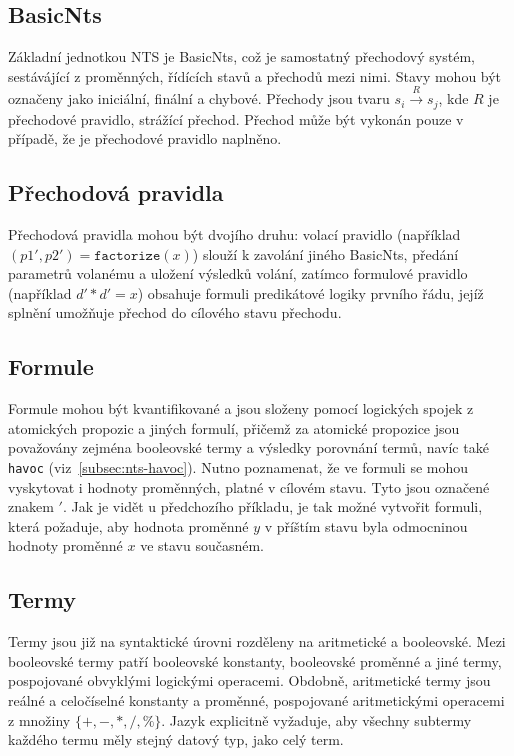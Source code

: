 \documentclass[10pt,a4paper,notitlepage]{report}
\begin{document}
\subsection{BasicNts}
Základní jednotkou NTS je BasicNts, což je samostatný přechodový systém, sestávájící z proměnných, řídících stavů a přechodů mezi nimi. Stavy mohou být označeny jako iniciální, finální a chybové. Přechody jsou tvaru $s_i \overset{R}{\rightarrow} s_j$, kde $R$ je přechodové pravidlo, strážící přechod. Přechod může být vykonán pouze v případě, že je přechodové pravidlo naplněno.

\subsection{Přechodová pravidla}
Přechodová pravidla mohou být dvojího druhu: volací pravidlo (například  $(p1',p2') = \texttt{factorize} (x)$) slouží k zavolání jiného BasicNts, předání parametrů volanému a uložení výsledků volání, zatímco formulové pravidlo (například $d' * d' = x$) obsahuje formuli predikátové logiky prvního řádu, jejíž splnění umožňuje přechod do cílového stavu přechodu. 

\subsection{Formule}
Formule mohou být kvantifikované a jsou složeny pomocí logických spojek z atomických propozic a jiných formulí, přičemž za atomické propozice jsou považovány zejména booleovské termy a výsledky porovnání termů, navíc také \texttt{havoc} (viz~\ref{subsec:nts-havoc}). Nutno poznamenat, že ve formuli se mohou vyskytovat i hodnoty proměnných, platné v cílovém stavu. Tyto jsou označené znakem $\prime$. Jak je vidět u předchozího příkladu, je tak možné vytvořit formuli, která požaduje, aby hodnota proměnné $y$ v příštím stavu byla odmocninou hodnoty proměnné $x$ ve stavu současném.

\subsection{Termy}
Termy jsou již na syntaktické úrovni rozděleny na aritmetické a booleovské. Mezi booleovské termy patří booleovské konstanty, booleovské proměnné a jiné termy, pospojované obvyklými logickými operacemi. Obdobně, aritmetické termy jsou reálné a celočíselné konstanty a proměnné, pospojované aritmetickými operacemi z množiny $\{+, -, *, /, \% \}$. Jazyk explicitně vyžaduje, aby všechny subtermy každého termu měly stejný datový typ, jako celý term.
\end{document}
